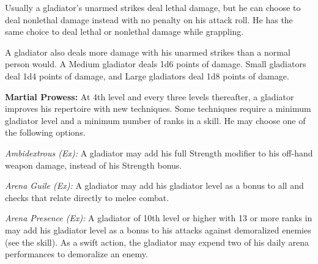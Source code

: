 Usually a gladiator's unarmed strikes deal lethal damage, but he can choose to deal nonlethal damage instead with no penalty on his attack roll. He has the same choice to deal lethal or nonlethal damage while grappling.

A gladiator also deals more damage with his unarmed strikes than a normal person would. A Medium gladiator deals 1d6 points of damage. Small gladiators deal 1d4 points of damage, and Large gladiators deal 1d8 points of damage.


\textbf{Martial Prowess:} At 4th level and every three levels thereafter, a gladiator improves his repertoire with new techniques. Some techniques require a minimum gladiator level and a minimum number of ranks in a skill. He may choose one of the following options.

 

\textit{Ambidextrous (Ex):} A gladiator may add his full Strength modifier to his off-hand weapon damage, instead of \onehalf his Strength bonus.

\textit{Arena Guile (Ex):} A gladiator may add \onehalf his gladiator level as a bonus to all  and  checks that relate directly to melee combat.

\textit{Arena Presence (Ex):} A gladiator of 10th level or higher with 13 or more ranks in  may add \onequarter his gladiator level as a bonus to his attacks against demoralized enemies (see the  skill). As a swift action, the gladiator may expend two of his daily arena performances to demoralize an enemy.

